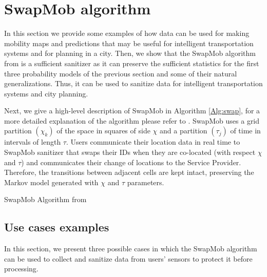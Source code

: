 \documentclass[times,twocolumn,final,authoryear]{elsarticle}
\begin{document}
\section{SwapMob algorithm}\label{Sec:swapmob}
{\color{blue} 
In this section we provide some examples of how data can be used for making mobility maps and predictions that may be useful for intelligent transportation systems and for planning in a city.
Then, we show that the SwapMob algorithm from \cite{Salas:2018-c} is a sufficient sanitizer as it can preserve the sufficient statistics for the first three probability models of the previous section and some of their natural generalizations. Thus, it can be used to sanitize data for intelligent transportation systems and city planning.

Next, we give a high-level description of SwapMob in Algorithm \ref{Alg:swap}, for a more detailed explanation of the algorithm please refer to \cite{Salas:2018-c}. 
SwapMob uses a grid partition $(\chi_k)$ of the space in squares of side $\chi$ and a partition $(\tau_j)$ of time in intervals of length $\tau$.
Users communicate their location data in real time to SwapMob sanitizer that swaps their IDs when they are co-located (with respect $\chi$ and $\tau$) and communicates their change of locations to the Service Provider.
Therefore, the transitions between adjacent cells are kept intact, preserving the Markov model generated with $\chi$ and $\tau$ parameters.}
\begin{algorithm}[t]
\SetAlgoNoLine
{}

\caption{SwapMob Algorithm from \cite{Salas:2018-c}}\label{Alg:swap}
\label{alg:one}
\end{algorithm}


\subsection{Use cases examples}
{\color{blue}
In this section, we present three possible cases in which the SwapMob algorithm can be used to collect and sanitize data
from users' sensors to protect it before processing.
}
\end{document}
